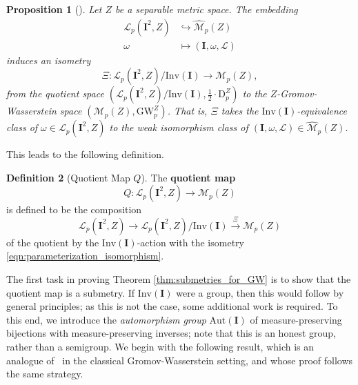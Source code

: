 \documentclass{article}
\newtheorem{proposition}{Proposition}[section]
\theoremstyle{definition}
\newtheorem{definition}[proposition]{Definition}
\newcommand{\M}{\mathcal{M}}
\newcommand{\MZpNoSim}{\widehat{\M}_p(Z)}
\newcommand{\MZp}{\M_p(Z)}
\newcommand{\dgwz}{\mathrm{GW}_p^Z}
\newcommand{\Lp}{\mathcal{L}_p}
\newcommand{\dpz}{\mathrm{D}^Z_p}
\begin{document}
\begin{proposition}[{\cite[Theorem 34]{bauer2025zgromovwassersteindistance}}]
    \label{prop:zg_as_quotient_by_inv}
    Let $Z$ be a separable metric space. The embedding 
    \begin{align*}
        \Lp(\mathbf{I}^2,Z) &\hookrightarrow \MZpNoSim \\
        \omega &\mapsto (\mathbf{I},\omega,\mathscr{L})
    \end{align*}
    induces an isometry 
    \begin{equation}\label{eqn:parameterization_isomorphism}
        \Xi:\Lp(\mathbf{I}^2, Z)/\mathrm{Inv}(\mathbf{I}) \to \MZp, 
    \end{equation}
    from the quotient space $(\Lp(\mathbf{I}^2, Z)/\mathrm{Inv}(\mathbf{I}), \frac{1}{2} \cdot \dpz)$ to the $Z$-Gromov-Wasserstein space $(\MZp, \dgwz)$. That is, $\Xi$ takes the $\mathrm{Inv}(\mathbf{I})$-equivalence class of $\omega \in \Lp(\mathbf{I}^2,Z)$ to the weak isomorphism class of $(\mathbf{I},\omega,\mathscr{L}) \in \MZpNoSim$.
\end{proposition}




This leads to the following definition.

\begin{definition}[Quotient Map $Q$]\label{def:quotient_map}
    The \textbf{quotient map} 
    \[
    Q:\Lp(\mathbf{I}^2,Z) \to \MZp
    \]
    is defined to be the composition
    \[
    \Lp(\mathbf{I}^2,Z) \to \Lp(\mathbf{I}^2,Z)/\mathrm{Inv}(\mathbf{I}) \xrightarrow{\Xi} \MZp
    \]
    of the quotient by the $\mathrm{Inv}(\mathbf{I})$-action
    with the isometry \eqref{eqn:parameterization_isomorphism}.
\end{definition}

%
%
%
%
%
%
%
%

%
%
%
%
%
%
%
%
%
%
%
%
%
%
%
%
%
%
%
%
%
%
%
%
%
%
%
%
%
%
%
%
%

%
%
%
%
%
%
%
%
%
%
%
%
%


The first task in proving Theorem \ref{thm:submetries_for_GW} is to show that the quotient map is a submetry. If $\mathrm{Inv}(\mathbf{I})$ were a group, then this would follow by general principles; as this is not the case, some additional work is required. To this end, we introduce the \emph{automorphism group} $\mathrm{Aut}(\mathbf{I})$ of measure-preserving bijections with measure-preserving inverses; note that this is an honest group, rather than a semigroup. We begin with the following result, which is an analogue of~\cite[Theorem 3.2]{memoli_needham_2024_gw_gm} in the classical Gromov-Wasserstein setting, and whose proof follows the same strategy.
\end{document}

